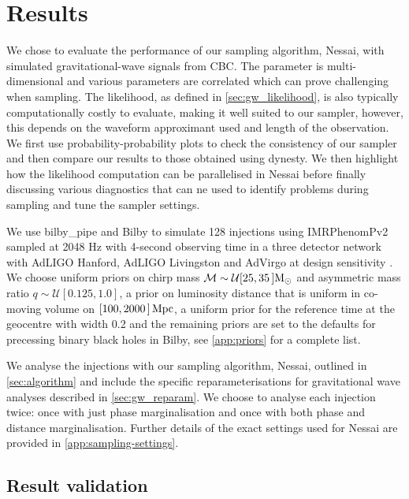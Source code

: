 \documentclass[%
 reprint,
nofootinbib,
 amsmath,amssymb,
 aps,
 prd,
]{revtex4-2}
\newcommand{\nessai}{{\sc Nessai}\xspace}
\newcommand{\bilby}{{\sc Bilby}\xspace}
\newcommand{\bilbypipe}{{\sc bilby\_pipe}\xspace}
\newcommand{\dynesty}{{\sc dynesty}\xspace}
\newcommand{\imrphenomp}{{\sc IMRPhenomPv2}\xspace}
\begin{document}
\section{Results}\label{sec:results}

We chose to evaluate the performance of our sampling algorithm, \nessai, with simulated gravitational-wave signals from \ac{CBC}. The parameter is multi-dimensional and various parameters are correlated which can prove challenging when sampling. The likelihood, as defined in \cref{sec:gw_likelihood}, is also typically computationally costly to evaluate, making it well suited to our sampler, however, this depends on the waveform approximant used and length of the observation. We first use probability-probability plots to check the consistency of our sampler and then compare our results to those obtained using \dynesty. We then highlight how the likelihood computation can be parallelised in \nessai before finally discussing various diagnostics that can ne used to identify problems during sampling and tune the sampler settings.

We use \bilbypipe and \bilby \cite{Ashton:2019} to simulate 128 injections using \imrphenomp \cite{Schmidt:2012,Khan:2019} sampled at 2048 Hz with 4-second observing time in a three detector network with AdLIGO Hanford, AdLIGO Livingston and AdVirgo at design sensitivity \cite{Aasi:2013wya}. We choose uniform priors on chirp mass $\mathcal{M} \sim \mathcal{U} \unit[[25, 35]]{\text{M}_{\odot}}$ and asymmetric mass ratio  $q \sim \mathcal{U}[0.125, 1.0]$, a prior on luminosity distance that is uniform in co-moving volume on $\unit[[100, 2000]]\,{\text{Mpc}}$, a uniform prior for the reference time at the geocentre with width 0.2 and the remaining priors are set to the defaults for precessing binary black holes in \bilby \cite{Romero-Shaw:2020}, see \cref{app:priors} for a complete list.

We analyse the injections with our sampling algorithm, \nessai, outlined in \cref{sec:algorithm} and include the specific reparameterisations for gravitational wave analyses described in \cref{sec:gw_reparam}. We choose to analyse each injection twice: once with just phase marginalisation and once with both phase and distance marginalisation. Further details of the exact settings used for \nessai are provided in \cref{app:sampling-settings}.

\subsection{Result validation}\label{sec:validaton}
\end{document}
